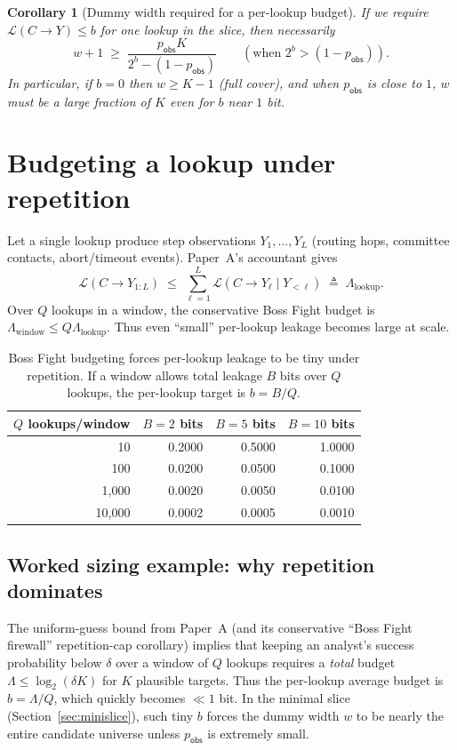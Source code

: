 \documentclass[11pt]{article}
\newcommand{\MaxL}{\mathcal{L}}
\newcommand{\logtwo}{\log_2}
\newtheorem{corollary}{Corollary}
\begin{document}
\begin{corollary}[Dummy width required for a per-lookup budget]\label{cor:w_required}
If we require $\MaxL(C\!\to\!Y)\le b$ for one lookup in the slice, then necessarily
\[
w{+}1 \;\ge\; \frac{p_{\mathsf{obs}}K}{2^{b}-(1-p_{\mathsf{obs}})}\qquad (\text{when }2^{b}>(1-p_{\mathsf{obs}})).
\]
In particular, if $b=0$ then $w\ge K{-}1$ (full cover), and when $p_{\mathsf{obs}}$ is close to $1$, $w$ must be a large fraction of $K$ even for $b$ near $1$ bit.
\end{corollary}


\section{Budgeting a lookup under repetition}\label{sec:budget}
Let a single lookup produce step observations $Y_1,\dots,Y_L$ (routing hops, committee contacts, abort/timeout events).
Paper~A's accountant gives
\[
\MaxL(C\!\to\!Y_{1:L}) \;\le\; \sum_{\ell=1}^L \MaxL(C\!\to\!Y_\ell\mid Y_{<\ell}) \;\triangleq\; \Lambda_{\mathrm{lookup}}.
\]
Over $Q$ lookups in a window, the conservative Boss Fight budget is $\Lambda_{\mathrm{window}}\le Q\Lambda_{\mathrm{lookup}}$.
Thus even ``small'' per-lookup leakage becomes large at scale.


\begin{table}[t]
\centering
\caption{Boss Fight budgeting forces per-lookup leakage to be tiny under repetition. If a window allows total leakage $B$ bits over $Q$ lookups, the per-lookup target is $b=B/Q$.}
\label{tab:per-lookup-target}
\begin{tabular}{r r r r}
\toprule
$Q$ lookups/window & $B{=}2$ bits & $B{=}5$ bits & $B{=}10$ bits\\
\midrule
10 & 0.2000 & 0.5000 & 1.0000\\
100 & 0.0200 & 0.0500 & 0.1000\\
1,000 & 0.0020 & 0.0050 & 0.0100\\
10,000 & 0.0002 & 0.0005 & 0.0010\\
\bottomrule
\end{tabular}
\end{table}

\subsection{Worked sizing example: why repetition dominates}\label{sec:worked}
The uniform-guess bound from Paper~A (and its conservative ``Boss Fight firewall'' repetition-cap corollary) implies that keeping an analyst's success probability below $\delta$ over a window of $Q$ lookups requires a \emph{total} budget $\Lambda\le \logtwo(\delta K)$ for $K$ plausible targets.
Thus the per-lookup average budget is $b=\Lambda/Q$, which quickly becomes $\ll 1$ bit.
In the minimal slice (Section~\ref{sec:minislice}), such tiny $b$ forces the dummy width $w$ to be nearly the entire candidate universe unless $p_{\mathsf{obs}}$ is extremely small.
\end{document}
